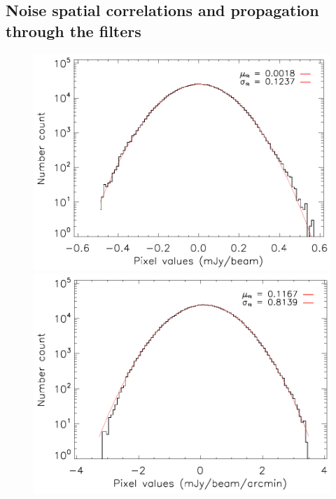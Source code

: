 \documentclass[traditabstract]{aa}
\begin{document}
\subsection{Noise spatial correlations and propagation through the filters}\label{sec:Noise_spatial_correlations_and_propagation_through_the_filters}
\begin{figure}[h]
\centering
\includegraphics[trim=0cm 0cm 0cm 0cm, clip=true, totalheight=4.4cm]{Figure/DoG_noise_stat_CLJ1227.pdf}
\includegraphics[trim=0cm 0cm 0cm 0cm, clip=true, totalheight=4.4cm]{Figure/GGM_noise_stat_CLJ1227.pdf}

\end{figure}
\end{document}
